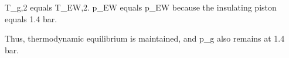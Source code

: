 T_g,2 equals T_EW,2.  
p_EW equals p_EW because the insulating piston equals 1.4 bar.  

Thus, thermodynamic equilibrium is maintained, and p_g also remains at 1.4 bar.